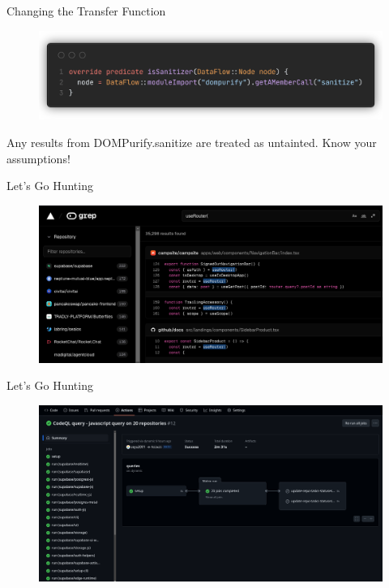 \documentclass[aspectratio=169,xcolor=dvipsnames]{beamer}
\begin{document}
\begin{frame}{Changing the Transfer Function}

	\begin{figure}
		\includegraphics[width=\textwidth]{img/7.png}
	\end{figure}

	Any results from DOMPurify.sanitize are treated as untainted. Know your
	assumptions!
\end{frame}

\begin{frame}{Let's Go Hunting}

	\begin{figure}
		\includegraphics[width=\textwidth]{img/8.png}
	\end{figure}

\end{frame}

\begin{frame}{Let's Go Hunting}
	\begin{figure}
		\includegraphics[width=\textwidth]{img/9.png}
	\end{figure}

\end{frame}
\end{document}
